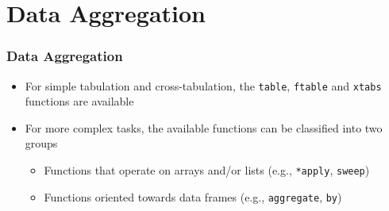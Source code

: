 \documentclass[paper=screen,mathserif]{beamer}\usepackage[]{graphicx}\usepackage[]{color}
\makeatletter
\newcommand{\hlopt}[1]{\textcolor[rgb]{0,0,0}{#1}}%
\newcommand{\hlstd}[1]{\textcolor[rgb]{0.345,0.345,0.345}{#1}}%
\newcommand{\hlkwd}[1]{\textcolor[rgb]{0.737,0.353,0.396}{\textbf{#1}}}%
\newenvironment{kframe}{%
 \def\at@end@of@kframe{}%
 \ifinner\ifhmode%
  \def\at@end@of@kframe{\end{minipage}}%
  \begin{minipage}{\columnwidth}%
 \fi\fi%
 \def\FrameCommand##1{\hskip\@totalleftmargin \hskip-\fboxsep
 \colorbox{shadecolor}{##1}\hskip-\fboxsep
     \hskip-\linewidth \hskip-\@totalleftmargin \hskip\columnwidth}%
 \MakeFramed {\advance\hsize-\width
   \@totalleftmargin\z@ \linewidth\hsize
   \@setminipage}}%
 {\par\unskip\endMakeFramed%
 \at@end@of@kframe}
\newenvironment{knitrout}{}{} %
\newcommand{\ft}[1]{\frametitle{#1}}
\makeatother
\begin{document}


\section{Data Aggregation}

\begin{frame}[fragile]
  \ft{Data Aggregation}
  
  \begin{itemize}
  \item For simple tabulation and cross-tabulation, the \verb=table=,
    \verb=ftable= and \verb=xtabs= functions are available
  \item For more complex tasks, the available functions can be
    classified into two groups
    \begin{itemize}
    \item Functions that operate on arrays and/or lists
      (e.g., \verb=*apply=, \verb=sweep=)
    \item Functions oriented towards data frames (e.g.,
      \verb=aggregate=, \verb=by=)
    \end{itemize}
  \end{itemize}
\end{frame}
\end{document}
